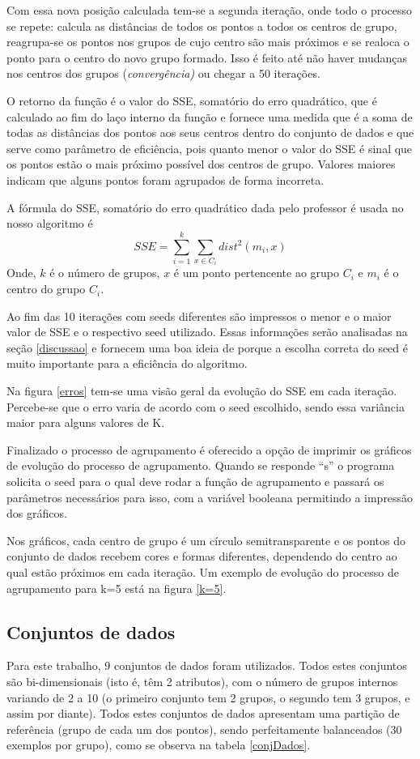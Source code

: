 \documentclass[12pt, a4paper]{article}
\begin{document}
Com essa nova posição calculada tem-se a segunda iteração, onde todo o processo se repete: calcula as distâncias de todos os pontos a todos os centros de grupo, reagrupa-se os pontos nos grupos de cujo centro são mais próximos e se realoca o ponto para o centro do novo grupo formado. Isso é feito até não haver mudanças nos centros dos grupos (\emph{convergência)} ou chegar a 50 iterações.

O retorno da função é o valor do SSE, somatório do erro quadrático, que é calculado ao fim do laço interno da função e fornece uma medida que é a soma de todas as distâncias dos pontos aos seus centros dentro do conjunto de dados e que serve como parâmetro de eficiência, pois quanto menor o valor do SSE é sinal que os pontos estão o mais próximo possível dos centros de grupo. Valores maiores indicam que alguns pontos foram agrupados de forma incorreta.

A fórmula do SSE, somatório do erro quadrático dada pelo professor é usada no nosso algoritmo é $$SSE = \sum_{i=1}^k \sum_{x\in C_i} dist^2(m_i,x)$$ Onde, $k$ é o número de grupos, $x$ é um ponto pertencente ao grupo $C_i$ e $m_i$ é o centro do grupo $C_i$.

Ao fim das 10 iterações com seeds diferentes são impressos o menor e o maior valor de SSE e o respectivo seed utilizado. Essas informações serão analisadas na seção \ref{discussao} e fornecem uma boa ideia de porque a escolha correta do seed é muito importante para a eficiência do algoritmo.

Na figura \ref{erros} tem-se uma visão geral da evolução do SSE em cada iteração. Percebe-se que o erro varia de acordo com o seed escolhido, sendo essa variância maior para alguns valores de K.

Finalizado o processo de agrupamento é oferecido a opção de imprimir os gráficos de evolução do processo de agrupamento. Quando se responde ``s'' o programa solicita o seed para o qual deve rodar a função de agrupamento e passará os parâmetros necessários para isso, com a variável booleana permitindo a impressão dos gráficos.

Nos gráficos, cada centro de grupo é um círculo semitransparente e os pontos do conjunto de dados recebem cores e formas diferentes, dependendo do centro ao qual estão próximos em cada iteração. Um exemplo de evolução do processo de agrupamento para k=5 está na figura \ref{k=5}.

\subsection{Conjuntos de dados}
\label{dados}
Para este trabalho, 9 conjuntos de dados foram utilizados. Todos estes conjuntos são bi-dimensionais (isto é, têm 2 atributos), com o número de grupos internos variando de 2 a 10 (o primeiro conjunto tem 2 grupos, o segundo tem 3 grupos, e assim por diante). Todos estes conjuntos de dados apresentam uma partição de referência (grupo de cada um dos pontos), sendo perfeitamente balanceados (30 exemplos por grupo), como se observa na tabela \ref{conjDados}.
\end{document}
